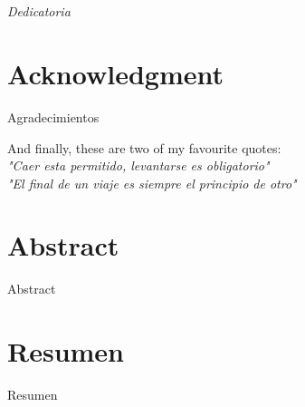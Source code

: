 \documentclass[a4paper, 12pt]{book}
\begin{document}
\newpage
\mbox{}
\thispagestyle{empty} %



\chapter*{}
\begin{flushright}
\textit{Dedicatoria
}
\end{flushright}


\chapter*{Acknowledgment}

Agradecimientos

And finally, these are two of my favourite quotes:\\ 

\textit{"Caer esta permitido, levantarse es obligatorio"}\\
\textit{"El final de un viaje es siempre el principio de otro"}



\chapter*{Abstract}
Abstract


\chapter*{Resumen}

Resumen
\end{document}
